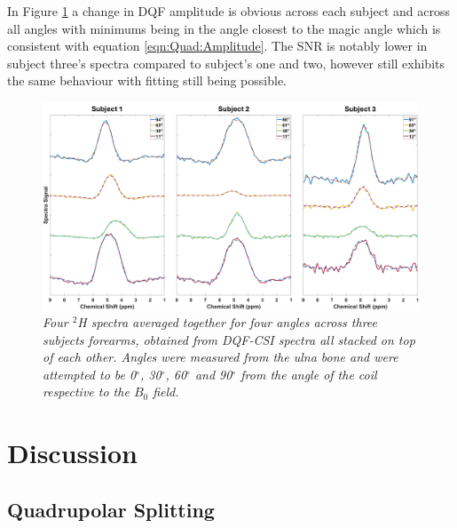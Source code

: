 \documentclass[class=article, crop=false]{standalone}
\begin{document}
In Figure \ref{fig:Quad:DQF_CSI_Angle} a change in DQF amplitude is obvious across each subject and across all angles with minimums being in the angle closest to the magic angle which is consistent with equation \ref{eqn:Quad:Amplitude}. The SNR is notably lower in subject three's spectra compared to subject's one and two, however still exhibits the same behaviour with fitting still being possible.

\begin{figure}
    \centering
    \includegraphics[width=1\textwidth]{Figures/Quad/DQF_CSI_Angle.png}
    \caption{\textit{Four $^2$H spectra averaged together for four angles across three subjects forearms, obtained from DQF-CSI spectra all stacked on top of each other. Angles were measured from the ulna bone and were attempted to be 0$^\circ$, 30$^\circ$, 60$^\circ$ and 90$^\circ$ from the angle of the coil respective to the $B_0$ field.}}
    \label{fig:Quad:DQF_CSI_Angle}
\end{figure}

\section{Discussion}

\subsection{Quadrupolar Splitting}
\end{document}
